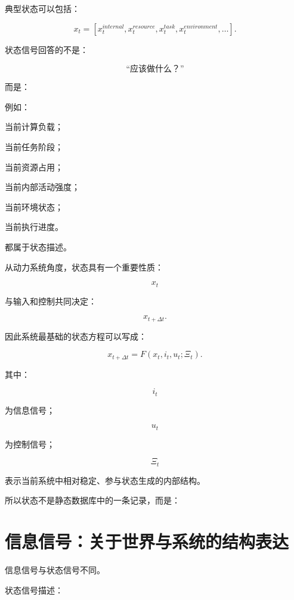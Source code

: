 典型状态可以包括：

\[
x_t
=
[
x_t^{internal},
x_t^{resource},
x_t^{task},
x_t^{environment},
\ldots
].
\]

状态信号回答的不是：

\[
\text{“应该做什么？”}
\]

而是：

\begin{statementbox}
\centering
{}
\end{statementbox}

例如：

当前计算负载；

当前任务阶段；

当前资源占用；

当前内部活动强度；

当前环境状态；

当前执行进度。

都属于状态描述。

从动力系统角度，状态具有一个重要性质：

\[
\boxed{
x_t
}
\]

与输入和控制共同决定：

\[
x_{t+\Delta t}.
\]

因此系统最基础的状态方程可以写成：

\[
\boxed{
x_{t+\Delta t}
=
F(
x_t,
i_t,
u_t;
\Xi_t
).
}
\]

其中：

\[
i_t
\]

为信息信号；

\[
u_t
\]

为控制信号；

\[
\Xi_t
\]

表示当前系统中相对稳定、参与状态生成的内部结构。

所以状态不是静态数据库中的一条记录，而是：

\begin{statementbox}
\centering
{}
\end{statementbox}

\section{信息信号：关于世界与系统的结构表达}

信息信号与状态信号不同。

状态信号描述：


